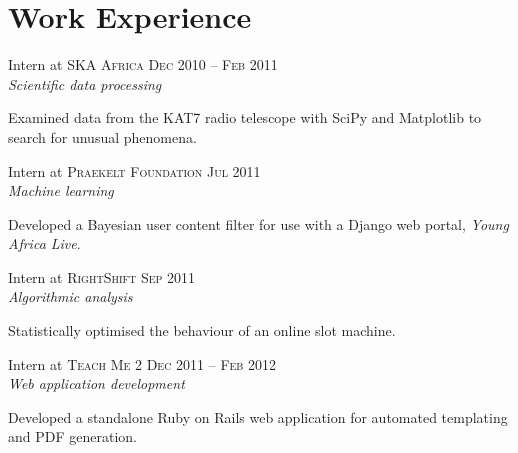 \documentclass[a4paper,10pt]{article} %
\begin{document}
\begin{minipage}[t]{0.5\textwidth}
\section{Work Experience} 


{\raggedright{\large Intern at \textsc{SKA Africa}} \hfill \textsc{Dec 2010 -- Feb 2011}\\
\textit{Scientific data processing}\\[5pt]}

Examined data from the KAT7 radio telescope with SciPy and Matplotlib to search for unusual phenomena.\\


{\raggedright{\large Intern at \textsc{Praekelt Foundation}} \hfill \textsc{Jul 2011}\\
\textit{Machine learning}\\[5pt]}

Developed a Bayesian user content filter for use with a Django web portal, \emph{Young Africa Live}.\\


{\raggedright{\large Intern at \textsc{RightShift}} \hfill \textsc{Sep 2011}\\
\textit{Algorithmic analysis}\\[5pt]}

Statistically optimised the behaviour of an online slot machine.\\


{\raggedright{\large Intern at \textsc{Teach Me 2}} \hfill \textsc{Dec 2011 -- Feb 2012}\\
\textit{Web application development}\\[5pt]}

Developed a standalone Ruby on Rails web application for automated templating and PDF generation.\\



\end{minipage}
\end{document}
